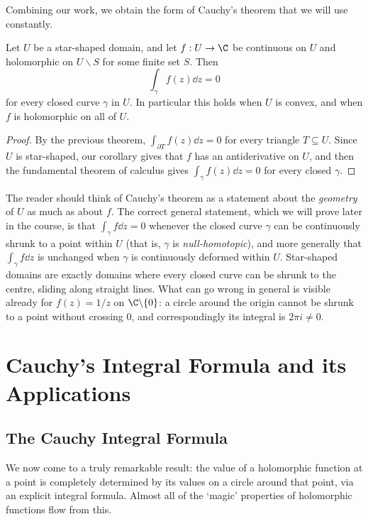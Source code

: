 Combining our work, we obtain the form of Cauchy's theorem that we will use constantly.

\begin{theorem}
    Let $U$ be a star-shaped domain, and let $f: U \rightarrow \C$ be continuous on $U$ and holomorphic on $U \backslash S$ for some finite set $S$. Then
    $$
    \int_\gamma f(z) \dd z = 0
    $$
    for every closed curve $\gamma$ in $U$. In particular this holds when $U$ is convex, and when $f$ is holomorphic on all of $U$.
\end{theorem}
\begin{proof}
    By the previous theorem, $\int_{\partial T} f(z) \dd z = 0$ for every triangle $T \subseteq U$. Since $U$ is star-shaped, our corollary gives that $f$ has an antiderivative on $U$, and then the fundamental theorem of calculus gives $\int_\gamma f(z) \dd z = 0$ for every closed $\gamma$.
\end{proof}

\begin{remark}
    The reader should think of Cauchy's theorem as a statement about the \emph{geometry} of $U$ as much as about $f$. The correct general statement, which we will prove later in the course, is that $\int_\gamma f \dd z = 0$ whenever the closed curve $\gamma$ can be continuously shrunk to a point within $U$ (that is, $\gamma$ is \emph{null-homotopic}), and more generally that $\int_\gamma f \dd z$ is unchanged when $\gamma$ is continuously deformed within $U$. Star-shaped domains are exactly domains where every closed curve can be shrunk to the centre, sliding along straight lines. What can go wrong in general is visible already for $f(z) = 1/z$ on $\C\backslash\{0\}$: a circle around the origin cannot be shrunk to a point without crossing $0$, and correspondingly its integral is $2\pi i \neq 0$.
\end{remark}

\section{Cauchy's Integral Formula and its Applications}

\subsection{The Cauchy Integral Formula}

We now come to a truly remarkable result: the value of a holomorphic function at a point is completely determined by its values on a circle around that point, via an explicit integral formula. Almost all of the `magic' properties of holomorphic functions flow from this.

